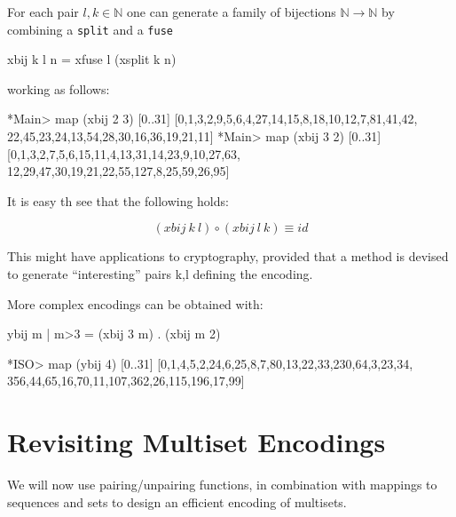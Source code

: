 \documentclass[]{INCLUDES/llncs}
\begin{document}
For each pair $l,k \in \mathbb{N}$ one can generate a family of bijections
$\mathbb{N}\rightarrow \mathbb{N}$ by combining a {\tt split} and a {\tt fuse}
\begin{code}
xbij k l n = xfuse l (xsplit k n) 
\end{code}
working as follows:
\begin{codex}
*Main> map (xbij 2 3) [0..31]
[0,1,3,2,9,5,6,4,27,14,15,8,18,10,12,7,81,41,42,
 22,45,23,24,13,54,28,30,16,36,19,21,11]
*Main> map (xbij 3 2) [0..31]
[0,1,3,2,7,5,6,15,11,4,13,31,14,23,9,10,27,63,
 12,29,47,30,19,21,22,55,127,8,25,59,26,95]
\end{codex}
It is easy th see that the following holds:
\begin{prop}
\begin{equation}
(xbij~k~l) \circ (xbij~l~k) \equiv id
\end{equation}
\end{prop}
This might have applications to cryptography, provided that a
method is devised to generate ``interesting'' pairs k,l defining the encoding.

More complex encodings can be obtained with:
\begin{code}
ybij m | m>3 = (xbij 3 m) . (xbij m 2)
\end{code}
\begin{codex}
*ISO> map (ybij 4) [0..31]
[0,1,4,5,2,24,6,25,8,7,80,13,22,33,230,64,3,23,34,
 356,44,65,16,70,11,107,362,26,115,196,17,99]
\end{codex}

\section{Revisiting Multiset Encodings}
We will now use pairing/unpairing functions, in combination with mappings to
sequences and sets to design an efficient encoding of multisets.
\end{document}
